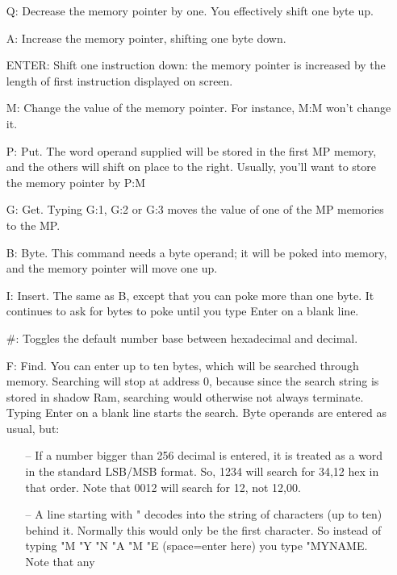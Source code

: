 \begin{itemize}
  \item[Q:] Decrease the memory pointer by one.  You effectively shift one
           byte up.
  \item[A:] Increase the memory pointer, shifting one byte down.
  \item[ENTER:] Shift one instruction down: the memory pointer is
           increased by the length of first instruction displayed on
           screen.
  \item[M:] Change the value of the memory pointer.  For instance, M:M
           won't change it.
  \item[P:] Put.  The word operand supplied will be stored in the first MP
           memory, and the others will shift on place to the right.
           Usually, you'll want to store the memory pointer by P:M
  \item[G:] Get.  Typing G:1, G:2 or G:3 moves the value of one of the MP
           memories to the MP\@.
  \item[B:] Byte.  This command needs a byte operand; it will be poked
           into memory, and the memory pointer will move one up.
  \item[I:] Insert.  The same as B, except that you can poke more than one
           byte.  It continues to ask for bytes to poke until you type
           Enter on a blank line.
  \item[\#:] Toggles the default number base between hexadecimal and
           decimal.
  \item[F:] Find.  You can enter up to ten bytes, which will be searched
           through memory.  Searching will stop at address 0, because
           since the search string is stored in shadow Ram, searching
           would otherwise not always terminate.  Typing Enter on a blank
           line starts the search.  Byte operands are entered as usual,
           but:
  \begin{itemize}
    \item[--] If a number bigger than 256 decimal is entered, it is
             treated as a word in the standard LSB/MSB format.  So, 1234
             will search for 34,12 hex in that order.  Note that 0012
             will search for 12, not 12,00.
    \item[--] A line starting with " decodes into the string of characters
             (up to ten) behind it.  Normally this would only be the
             first character.  So instead of typing "M "Y "N "A "M "E
             (space=enter here) you type "MYNAME\@.  Note that any

\end{itemize}
\end{itemize}
